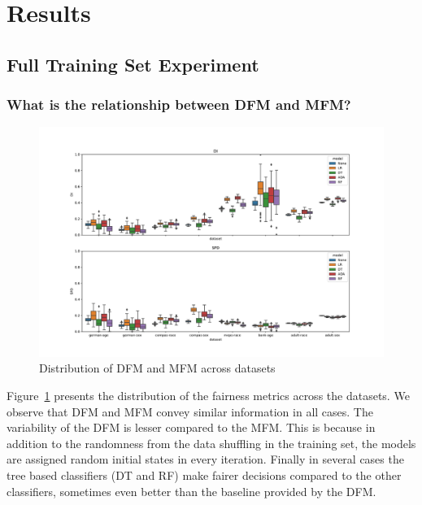 \documentclass{article}
\begin{document}
\section{Results}\label{sec:results}

\subsection{Full Training Set Experiment}\label{sec:results-full}

\subsubsection{What is the relationship between DFM and MFM?}\label{sec:results-full-rel}

\begin{figure}
  \centering
  \includegraphics[width=0.95\linewidth]{boxplot--dataset--di-spd--exp-full.pdf}
  \caption{Distribution of DFM and MFM across datasets}
  \label{fig:boxplot--dataset--di-spd--exp-full}
\end{figure}

Figure \ref{fig:boxplot--dataset--di-spd--exp-full} presents the
distribution of the fairness metrics across the datasets. We observe
that DFM and MFM convey similar information in all cases. The
variability of the DFM is lesser compared to the MFM. This is because
in addition to the randomness from the data shuffling in the training
set, the models are assigned random initial states in every iteration.
Finally in several cases the tree based classifiers (DT and RF) make
fairer decisions compared to the other classifiers, sometimes even
better than the baseline provided by the DFM.
\end{document}
